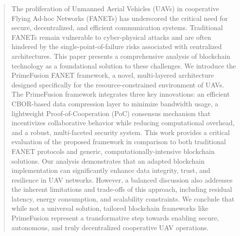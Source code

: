 \begin{abstract}
The proliferation of Unmanned Aerial Vehicles (UAVs) in cooperative Flying Ad-hoc Networks (FANETs) has underscored the critical need for secure, decentralized, and efficient communication systems. Traditional FANETs remain vulnerable to cyber-physical attacks and are often hindered by the single-point-of-failure risks associated with centralized architectures. This paper presents a comprehensive analysis of blockchain technology as a foundational solution to these challenges. We introduce the PrimeFusion FANET framework, a novel, multi-layered architecture designed specifically for the resource-constrained environment of UAVs. The PrimeFusion framework integrates three key innovations: an efficient CBOR-based data compression layer to minimize bandwidth usage, a lightweight Proof-of-Cooperation (PoC) consensus mechanism that incentivizes collaborative behavior while reducing computational overhead, and a robust, multi-faceted security system. This work provides a critical evaluation of the proposed framework in comparison to both traditional FANET protocols and generic, computationally-intensive blockchain solutions. Our analysis demonstrates that an adapted blockchain implementation can significantly enhance data integrity, trust, and resilience in UAV networks. However, a balanced discussion also addresses the inherent limitations and trade-offs of this approach, including residual latency, energy consumption, and scalability constraints. We conclude that while not a universal solution, tailored blockchain frameworks like PrimeFusion represent a transformative step towards enabling secure, autonomous, and truly decentralized cooperative UAV operations.
\end{abstract}
